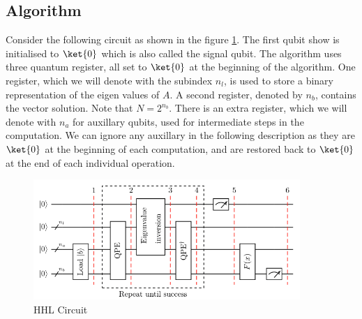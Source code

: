 \documentclass[12pt, oneside]{book}
\theoremstyle{definition}
\theoremstyle{definition}
\theoremstyle{remark}
\begin{document}
\subsection{Algorithm}
Consider the following circuit as shown in the figure \ref{fig:hhl_circuit}. The first qubit show is initialised to $\ket{0}$ which is also called the signal qubit. The algorithm uses three quantum register, all set to $\ket{0}$ at the beginning of the algorithm. One register, which we will denote with the subindex $n_l$, is used to store a binary representation of the eigen values of $A$. A second register, denoted by $n_b$, contains the vector solution. Note that $N=2^{n_b}$. There is an extra register, which we will denote with $n_a$ for auxillary qubits, used for intermediate steps in the computation. We can ignore any auxillary in the following description as they are $\ket{0}$ at the beginning of each computation, and are restored back to $\ket{0}$ at the end of each individual operation.
\begin{figure}[H]
    \centering
    \includegraphics[width=0.9\textwidth]{../images/hhl_circuit.png}
    \caption{HHL Circuit}
    \label{fig:hhl_circuit}
\end{figure}
\end{document}
